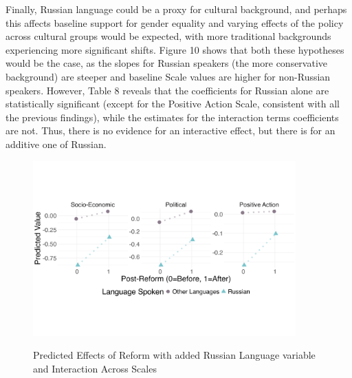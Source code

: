 \documentclass[12pt,letterpaper]{article}
\begin{document}
\begin{enumerate}
	\noindent Finally, Russian language could be a proxy for cultural background, and perhaps this affects baseline support for gender equality and varying effects of the policy across cultural groups would be expected, with more traditional backgrounds experiencing more significant shifts. Figure 10 shows that both these hypotheses would be the case, as the slopes for Russian speakers (the more conservative background) are steeper and baseline Scale values are higher for non-Russian speakers. However, Table 8 reveals that the coefficients for Russian alone are statistically significant (except for the Positive Action Scale, consistent with all the previous findings), while the estimates for the interaction terms coefficients are not. Thus, there is no evidence for an interactive effect, but there is for an additive one of Russian. 
	
	\begin{figure}[H]
		\centering
		\caption{Predicted Effects of Reform with added Russian Language variable and Interaction Across Scales}
		\vspace{-1cm}
		\includegraphics[width=0.9\textwidth]{russian_plot}
		\label{fig:russian_plot}
	\end{figure}
	

\end{enumerate}
\end{document}
